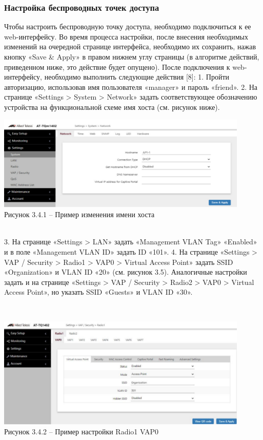     \subsubsection{Настройка беспроводных точек доступа}
    Чтобы настроить беспроводную точку доступа, необходимо подключиться к ее web-интерфейсу.
    Во время процесса настройки, после внесения необходимых изменений на очередной странице интерфейса,
    необходимо их сохранить, нажав кнопку «Save & Apply» в правом нижнем углу страницы
    (в алгоритме действий, приведенном ниже, это действие будет опущено).
    После подключения к web-интерфейсу, необходимо выполнить следующие действия [8]:
    1. Пройти авторизацию, использовав имя пользователя «manager» и пароль «friend».
    2. На странице «Settings > System > Network» задать соответствующее обозначению устройства
    на функциональной схеме имя хоста (см. рисунок ниже).
    \\
    \begin{center}
        \includegraphics[width=0.9\textwidth]{images/point1}\\
        Рисунок 3.4.1 – Пример изменения имени хоста
    \end{center}
    \\

    3. На странице «Settings > LAN» задать «Management VLAN Tag» «Enabled» и в поле «Management VLAN ID» задать ID «101».
    4. На странице «Settings > VAP / Security > Radio1 > VAP0 > Virtual Access Point»
    задать SSID «Organization» и VLAN ID «20» (см. рисунок 3.5).
    Аналогичные настройки задать и на странице «Settings > VAP / Security >
    Radio2 > VAP0 > Virtual Access Point», но указать SSID «Guests» и VLAN ID «30».

    \\
    \begin{center}
        \includegraphics[width=0.9\textwidth]{images/point2}\\
        Рисунок 3.4.2 – Пример настройки Radio1 VAP0
    \end{center}
    \\


